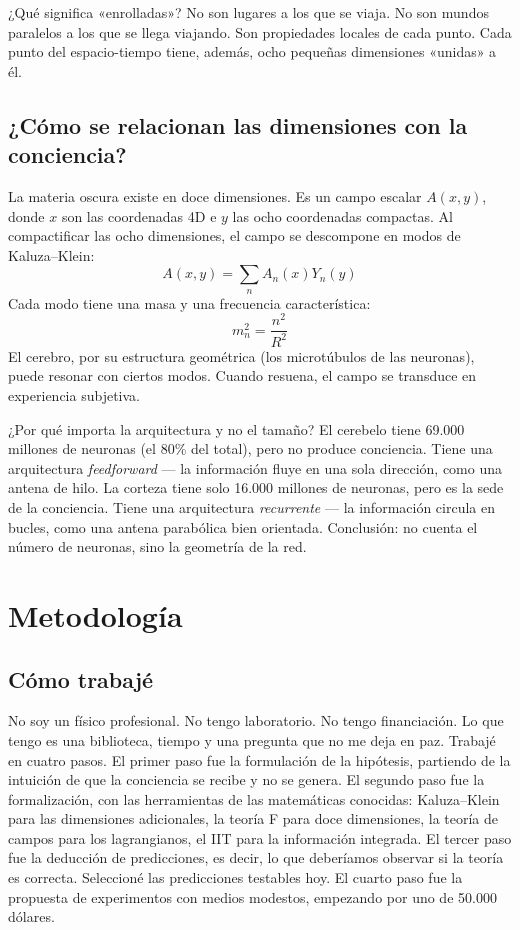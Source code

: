 ¿Qué significa «enrolladas»? No son lugares a los que se viaja. No son mundos paralelos a los que se llega viajando. Son propiedades locales de cada punto. Cada punto del espacio-tiempo tiene, además, ocho pequeñas dimensiones «unidas» a él.

\subsection{¿Cómo se relacionan las dimensiones con la conciencia?}
La materia oscura existe en doce dimensiones. Es un campo escalar $A(x,y)$, donde $x$ son las coordenadas 4D e $y$ las ocho coordenadas compactas. Al compactificar las ocho dimensiones, el campo se descompone en modos de Kaluza--Klein:
\begin{equation}
A(x,y) = \sum_n A_n(x) Y_n(y)
\end{equation}
Cada modo tiene una masa y una frecuencia característica:
\begin{equation}
m_n^2 = \frac{n^2}{R^2}
\end{equation}
El cerebro, por su estructura geométrica (los microtúbulos de las neuronas), puede resonar con ciertos modos. Cuando resuena, el campo se transduce en experiencia subjetiva.

¿Por qué importa la arquitectura y no el tamaño? El cerebelo tiene 69.000 millones de neuronas (el 80\% del total), pero no produce conciencia. Tiene una arquitectura \textit{feedforward} --- la información fluye en una sola dirección, como una antena de hilo. La corteza tiene solo 16.000 millones de neuronas, pero es la sede de la conciencia. Tiene una arquitectura \textit{recurrente} --- la información circula en bucles, como una antena parabólica bien orientada. Conclusión: no cuenta el número de neuronas, sino la geometría de la red.

\section{Metodología}
\subsection{Cómo trabajé}
No soy un físico profesional. No tengo laboratorio. No tengo financiación. Lo que tengo es una biblioteca, tiempo y una pregunta que no me deja en paz. Trabajé en cuatro pasos. El primer paso fue la formulación de la hipótesis, partiendo de la intuición de que la conciencia se recibe y no se genera. El segundo paso fue la formalización, con las herramientas de las matemáticas conocidas: Kaluza--Klein para las dimensiones adicionales, la teoría F para doce dimensiones, la teoría de campos para los lagrangianos, el IIT para la información integrada. El tercer paso fue la deducción de predicciones, es decir, lo que deberíamos observar si la teoría es correcta. Seleccioné las predicciones testables hoy. El cuarto paso fue la propuesta de experimentos con medios modestos, empezando por uno de 50.000 dólares.

